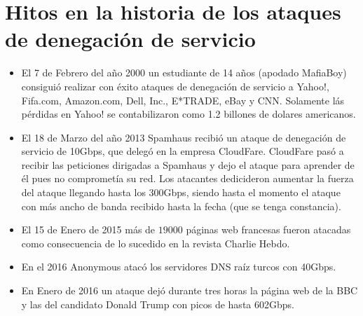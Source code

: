 \section{Hitos en la historia de los ataques de denegación de servicio}
\begin{itemize}
\item El 7 de Febrero del a\~no 2000 un estudiante de 14 a\~nos (apodado MafiaBoy\cite{mafiaboy}) consiguió realizar con éxito ataques de denegación de servicio a Yahoo!, Fifa.com, Amazon.com, Dell, Inc., E*TRADE, eBay y CNN. Solamente lás pérdidas en Yahoo! se contabilizaron como 1.2 billones de dolares americanos.
\item El 18 de Marzo del a\~no 2013 Spamhaus recibió un ataque de denegación de servicio de 10Gbps, que delegó en la empresa CloudFare. CloudFare pasó a recibir las peticiones dirigadas a Spamhaus y dejo el ataque para aprender de él pues no comprometía su red. Los atacantes dedicideron aumentar la fuerza del ataque llegando hasta los 300Gbps, siendo hasta el momento el ataque con más ancho de banda recibido hasta la fecha (que se tenga constancia)\cite{cloudfare}.
\item El 15 de Enero de 2015 más de $19000$ páginas web francesas fueron atacadas como consecuencia de lo sucedido en la revista Charlie Hebdo\cite{charlie}.
\item En el 2016 Anonymous atacó los servidores DNS raíz turcos con 40Gbps\cite{varios-2016}. 
\item En Enero de 2016 un ataque dejó durante tres horas la página web de la BBC y las del candidato Donald Trump con picos de hasta 602Gbps\cite{top-602}.
\end{itemize}
